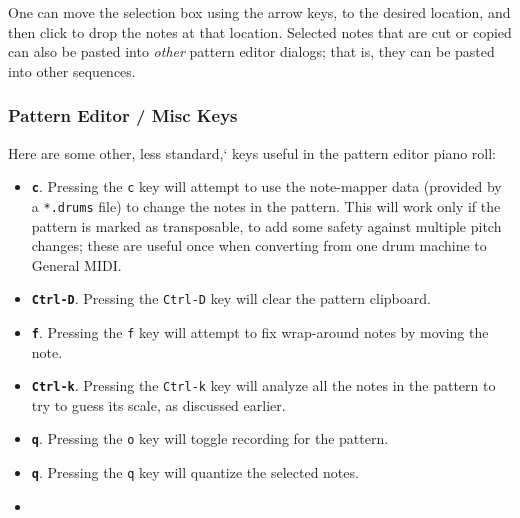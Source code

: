    One can move the selection box using the arrow keys, to the
   desired location, and then click to
   drop the notes at that location.
   Selected notes that are cut or copied can also be
   pasted into \textsl{other} pattern editor dialogs; that is, they can be
   pasted into other sequences.

\subsubsection{Pattern Editor / Misc Keys}
\label{subsubsec:pattern_editor_misc_keys}

   Here are some other, less standard,` keys useful in the pattern editor piano
   roll:

   \begin{itemize}
      \item
         \textbf{\texttt{c}}.
         Pressing the \texttt{c} key will attempt to use the note-mapper data
         (provided by a \texttt{*.drums} file) to change the notes in the
         pattern.  This will work only if the pattern is marked as transposable,
         to add some safety against multiple pitch changes; these are useful once
         when converting from one drum machine to General MIDI.
      \item
         \textbf{\texttt{Ctrl-D}}.
         Pressing the \texttt{Ctrl-D} key will clear the pattern clipboard.
      \item
         \textbf{\texttt{f}}.
         Pressing the \texttt{f} key will attempt to fix wrap-around notes by
         moving the note.
      \item
         \textbf{\texttt{Ctrl-k}}.
         Pressing the \texttt{Ctrl-k} key will analyze all the notes in the
         pattern to try to guess its scale, as discussed earlier.
      \item
         \textbf{\texttt{q}}.
         Pressing the \texttt{o} key will toggle recording for the pattern.
      \item
         \textbf{\texttt{q}}.
         Pressing the \texttt{q} key will quantize the selected notes.
      \item

\end{itemize}
